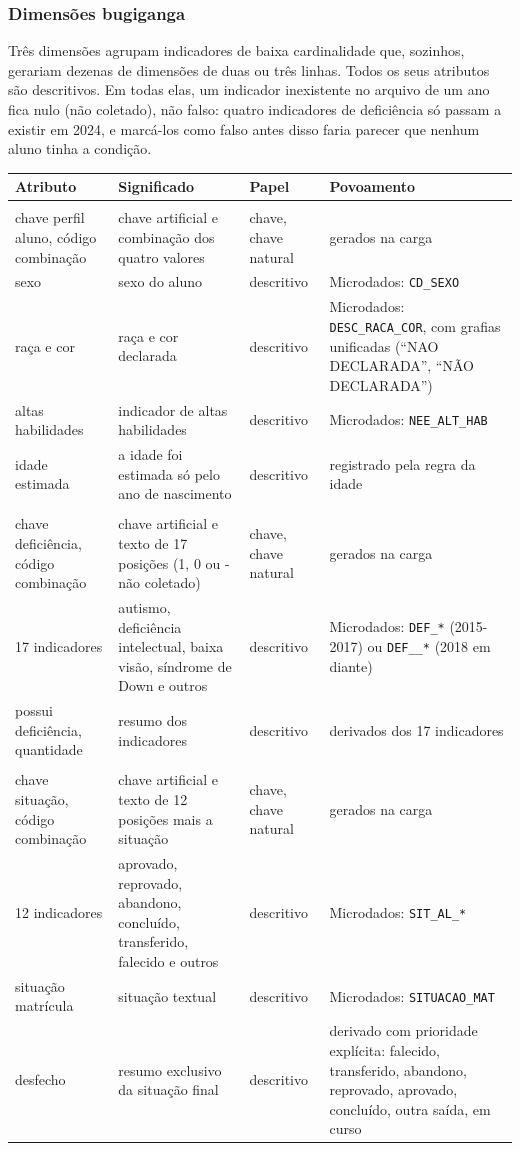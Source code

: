 \documentclass[11pt,a4paper]{article}
\newcommand{\cod}[1]{\texttt{#1}}
\newenvironment{atributos}{%
  \small
  \begin{longtable}{>{\raggedright}p{2.6cm}>{\raggedright}p{4.6cm}>{\raggedright}p{1.9cm}>{\raggedright\arraybackslash}p{5.3cm}}
  \toprule \textbf{Atributo} & \textbf{Significado} & \textbf{Papel} & \textbf{Povoamento}\\ \midrule \endhead
  \bottomrule \endlastfoot
}{\end{longtable}\addtocounter{table}{-1}}
\begin{document}
\subsubsection{Dimensões bugiganga}
Três dimensões agrupam indicadores de baixa cardinalidade que, sozinhos, gerariam dezenas de dimensões de duas ou três linhas. Todos os seus atributos são descritivos. Em todas elas, um indicador inexistente no arquivo de um ano fica nulo (não coletado), não falso: quatro indicadores de deficiência só passam a existir em 2024, e marcá-los como falso antes disso faria parecer que nenhum aluno tinha a condição.

\begin{atributos}
\multicolumn{4}{l}{\textit{Dimensão Perfil do Aluno}}\\
chave perfil aluno, código combinação & chave artificial e combinação dos quatro valores & chave, chave natural & gerados na carga \\
sexo & sexo do aluno & descritivo & Microdados: \cod{CD_SEXO} \\
raça e cor & raça e cor declarada & descritivo & Microdados: \cod{DESC_RACA_COR}, com grafias unificadas (``NAO DECLARADA'', ``NÃO DECLARADA'') \\
altas habilidades & indicador de altas habilidades & descritivo & Microdados: \cod{NEE_ALT_HAB} \\
idade estimada & a idade foi estimada só pelo ano de nascimento & descritivo & registrado pela regra da idade \\
\midrule
\multicolumn{4}{l}{\textit{Dimensão Deficiência}}\\
chave deficiência, código combinação & chave artificial e texto de 17 posições (1, 0 ou - não coletado) & chave, chave natural & gerados na carga \\
17 indicadores & autismo, deficiência intelectual, baixa visão, síndrome de Down e outros & descritivo & Microdados: \cod{DEF_*} (2015-2017) ou \cod{DEF__*} (2018 em diante) \\
possui deficiência, quantidade & resumo dos indicadores & descritivo & derivados dos 17 indicadores \\
\midrule
\multicolumn{4}{l}{\textit{Dimensão Situação da Matrícula}}\\
chave situação, código combinação & chave artificial e texto de 12 posições mais a situação & chave, chave natural & gerados na carga \\
12 indicadores & aprovado, reprovado, abandono, concluído, transferido, falecido e outros & descritivo & Microdados: \cod{SIT_AL_*} \\
situação matrícula & situação textual & descritivo & Microdados: \cod{SITUACAO_MAT} \\
desfecho & resumo exclusivo da situação final & descritivo & derivado com prioridade explícita: falecido, transferido, abandono, reprovado, aprovado, concluído, outra saída, em curso \\
\end{atributos}
\end{document}
